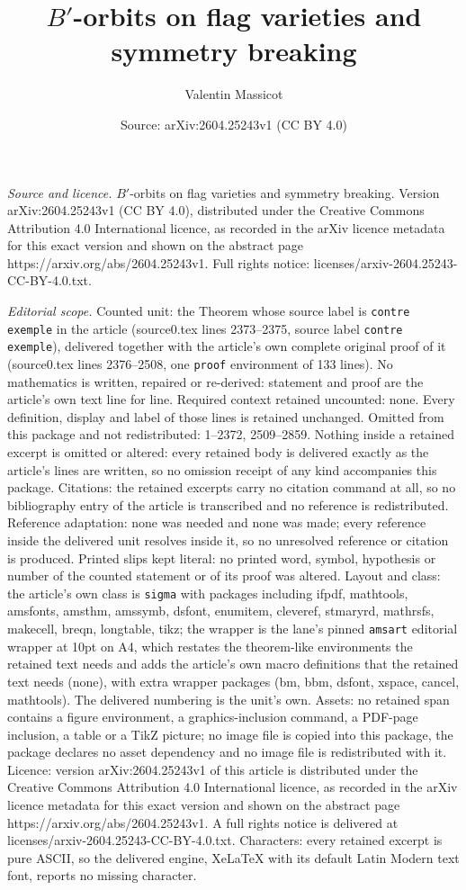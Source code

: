 \documentclass[10pt,a4paper]{amsart}
\title[$B'$-orbits on flag varieties and symmetry breaking]{$B'$-orbits on flag varieties and symmetry breaking}
\author{Valentin Massicot}
\date{Source: arXiv:2604.25243v1 (CC BY 4.0)}
\begin{document}
\maketitle

\noindent\emph{Source and licence.} $B'$-orbits on flag varieties and symmetry breaking. Version arXiv:2604.25243v1 (CC BY 4.0), distributed under the Creative Commons Attribution 4.0 International licence, as recorded in the arXiv licence metadata for this exact version and shown on the abstract page https://arxiv.org/abs/2604.25243v1. Full rights notice: licenses/arxiv-2604.25243-CC-BY-4.0.txt.\par\smallskip

\noindent\textit{Editorial scope.} Counted unit: the Theorem whose source label is \texttt{contre exemple} in the article (source0.tex lines 2373--2375, source label \texttt{contre exemple}), delivered together with the article's own complete original proof of it (source0.tex lines 2376--2508, one \texttt{proof} environment of 133 lines). No mathematics is written, repaired or re-derived: statement and proof are the article's own text line for line. Required context retained uncounted: none. Every definition, display and label of those lines is retained unchanged. Omitted from this package and not redistributed: 1--2372, 2509--2859. Nothing inside a retained excerpt is omitted or altered: every retained body is delivered exactly as the article's lines are written, so no omission receipt of any kind accompanies this package. Citations: the retained excerpts carry no citation command at all, so no bibliography entry of the article is transcribed and no reference is redistributed. Reference adaptation: none was needed and none was made; every reference inside the delivered unit resolves inside it, so no unresolved reference or citation is produced. Printed slips kept literal: no printed word, symbol, hypothesis or number of the counted statement or of its proof was altered. Layout and class: the article's own class is \texttt{sigma} with packages including ifpdf, mathtools, amsfonts, amsthm, amssymb, dsfont, enumitem, cleveref, stmaryrd, mathrsfs, makecell, breqn, longtable, tikz; the wrapper is the lane's pinned \texttt{amsart} editorial wrapper at 10pt on A4, which restates the theorem-like environments the retained text needs and adds the article's own macro definitions that the retained text needs (none), with extra wrapper packages (bm, bbm, dsfont, xspace, cancel, mathtools). The delivered numbering is the unit's own. Assets: no retained span contains a figure environment, a graphics-inclusion command, a PDF-page inclusion, a table or a TikZ picture; no image file is copied into this package, the package declares no asset dependency and no image file is redistributed with it. Licence: version arXiv:2604.25243v1 of this article is distributed under the Creative Commons Attribution 4.0 International licence, as recorded in the arXiv licence metadata for this exact version and shown on the abstract page https://arxiv.org/abs/2604.25243v1. A full rights notice is delivered at licenses/arxiv-2604.25243-CC-BY-4.0.txt. Characters: every retained excerpt is pure ASCII, so the delivered engine, XeLaTeX with its default Latin Modern text font, reports no missing character.
\end{document}
